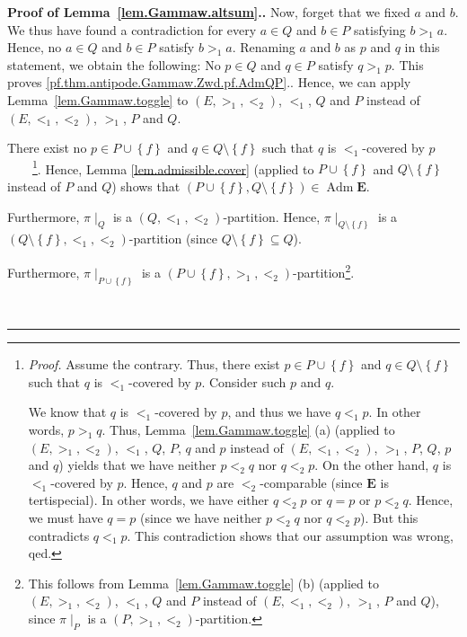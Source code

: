 \documentclass[numbers=enddot,12pt,final,onecolumn,notitlepage,abstracton]{scrartcl}
\theoremstyle{definition}
\newenvironment{proof}[1][Proof]{\noindent\textbf{#1.} }{\ \rule{0.5em}{0.5em}}
\newcommand{\Adm}{\operatorname{Adm}}
\newcommand{\EE}{{\mathbf{E}}}
\begin{document}
\begin{proof}[Proof of Lemma~\ref{lem.Gammaw.altsum}.]
{Now, forget that we fixed $a$ and $b$. We thus have found a
contradiction for every $a \in Q$ and $b \in P$ satisfying
$b >_1 a$. Hence, no $a \in Q$ and $b \in P$ satisfy $b >_1 a$.
Renaming $a$ and $b$ as $p$ and $q$ in this statement, we obtain
the following: No $p \in Q$ and $q \in P$ satisfy $q >_1 p$.
This proves \eqref{pf.thm.antipode.Gammaw.Zwd.pf.AdmQP}.}.
Hence, we can apply Lemma~\ref{lem.Gammaw.toggle} to
$\left(E, >_1, <_2\right)$, $<_1$, $Q$ and $P$ instead of
$\left(E, <_1, <_2\right)$, $>_1$, $P$ and $Q$.

There exist no $p\in P\cup\left\{  f\right\}  $ and $q\in
Q\setminus\left\{  f\right\}  $ such that $q$ is $<_{1}$-covered by
$p$\ \ \ \ \footnote{\textit{Proof.} Assume the contrary. Thus, there exist
$p\in P\cup\left\{  f\right\}  $ and $q\in Q\setminus\left\{  f\right\}  $
such that $q$ is $<_{1}$-covered by $p$. Consider such $p$ and $q$.
\par
We know that $q$ is $<_1$-covered by $p$, and thus we have
$q <_1 p$. In other words, $p >_1 q$. Thus,
Lemma~\ref{lem.Gammaw.toggle} (a) (applied to
$\left(E, >_1, <_2\right)$, $<_1$, $Q$, $P$, $q$ and $p$ instead of
$\left(E, <_1, <_2\right)$, $>_1$, $P$, $Q$, $p$ and $q$) yields
that we have neither $p <_2 q$ nor $q <_2 p$.
On the other hand,
$q$ is $<_{1}$-covered by $p$. Hence, $q$ and $p$ are
$<_{2}$-comparable (since $\EE$ is tertispecial).
In other words, we have either $q <_2 p$ or $q = p$ or $p <_2 q$.
Hence, we must have $q = p$ (since we have neither $p <_2 q$
nor $q <_2 p$). But this contradicts $q <_1 p$.
This contradiction shows that our
assumption was wrong, qed.}. Hence, Lemma \ref{lem.admissible.cover} (applied
to $P\cup\left\{  f\right\}  $ and $Q\setminus\left\{  f\right\}  $ instead of
$P$ and $Q$) shows that $\left(  P\cup\left\{  f\right\}  ,Q\setminus\left\{
f\right\}  \right)  \in \Adm \EE$.

Furthermore, $\pi\mid_{Q}$ is a $\left(  Q,<_{1},<_{2}\right)  $-partition.
Hence, $\pi\mid_{Q\setminus\left\{  f\right\}  }$ is a $\left(
Q\setminus\left\{  f\right\}  ,<_{1},<_{2}\right)  $-partition (since
$Q\setminus\left\{  f\right\}  \subseteq Q$).

Furthermore, $\pi\mid_{P\cup\left\{  f\right\}  }$ is a $\left(  P\cup\left\{
f\right\}  ,>_{1},<_{2}\right)  $-partition\footnote{This follows from
Lemma~\ref{lem.Gammaw.toggle} (b) (applied to
$\left(E, >_1, <_2\right)$, $<_1$, $Q$ and $P$ instead of
$\left(E, <_1, <_2\right)$, $>_1$, $P$ and $Q$), since $\pi\mid_P$ is a
$\left(P, >_1, <_2\right)$-partition.}.


\end{proof}
\end{document}
